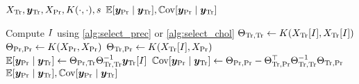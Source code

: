 \begin{algorithmic}[1]
  \REQUIRE \(
    X_{\text{Tr}}, \bm{y}_{\text{Tr}},
    X_{\text{Pr}}, K(\cdot, \cdot), s
  \)
  \ENSURE \(
      \operatorname{\mathbb{E}}[\bm{y}_{\text{Pr}} \mid \bm{y}_{\text{Tr}}],
    \operatorname{\mathbb{C}ov}[\bm{y}_{\text{Pr}} \mid \bm{y}_{\text{Tr}}]
  \)

  \STATE Compute \( I \) using
    \cref{alg:select_prec} or \cref{alg:select_chol}
  \STATE \(
    \Theta_{\text{Tr}, \text{Tr}} \gets
    K(X_{\text{Tr}}[I], X_{\text{Tr}}[I])
  \)
  \STATE \(
    \Theta_{\text{Pr}, \text{Pr}} \gets
    K(X_{\text{Pr}}, X_{\text{Pr}})
  \)
  \STATE \(
    \Theta_{\text{Tr}, \text{Pr}} \gets
    K(X_{\text{Tr}}[I], X_{\text{Pr}})
  \)
  \STATE \(
    \operatorname{\mathbb{E}}[\bm{y}_{\text{Pr}} \mid \bm{y}_{\text{Tr}}] \gets
    \Theta_{\text{Pr}, \text{Tr}} \Theta_{\text{Tr}, \text{Tr}}^{-1}
    \bm{y}_{\text{Tr}}[I]
  \)
  \STATE \(
    \operatorname{\mathbb{C}ov}[\bm{y}_{\text{Pr}} \mid \bm{y}_{\text{Tr}}] \gets
    \Theta_{\text{Pr}, \text{Pr}} -
    \Theta_{\text{Tr}, \text{Pr}}^{\top} \Theta_{\text{Tr}, \text{Tr}}^{-1}
    \Theta_{\text{Tr}, \text{Pr}}
  \)
  \RETURN \(
      \operatorname{\mathbb{E}}[\bm{y}_{\text{Pr}} \mid \bm{y}_{\text{Tr}}],
    \operatorname{\mathbb{C}ov}[\bm{y}_{\text{Pr}} \mid \bm{y}_{\text{Tr}}]
  \)
\end{algorithmic}
